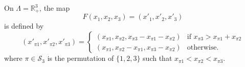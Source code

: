 On $\Lambda=\mathbb{R}^3_+$, the map
\[
F (x_1,x_2,x_3) = (x'_1,x'_2,x'_3)
\]
is defined by
\[
(x'_{\pi 1}, x'_{\pi 2}, x'_{\pi 3}) =
\begin{cases}
    (x_{\pi 1}, x_{\pi 2}, x_{\pi 3}-x_{\pi 1}-x_{\pi 2}) &\mbox{if }
	x_{\pi 3}>x_{\pi 1}+x_{\pi 2}\\
    (x_{\pi 1}, x_{\pi 2}-x_{\pi 1}, x_{\pi 3}-x_{\pi 2}) &\mbox{otherwise.}
\end{cases}
\]
where $\pi\in\mathcal{S}_3$ is the permutation of $\{1,2,3\}$ such that
$x_{\pi 1}<x_{\pi 2}<x_{\pi 3}$.
